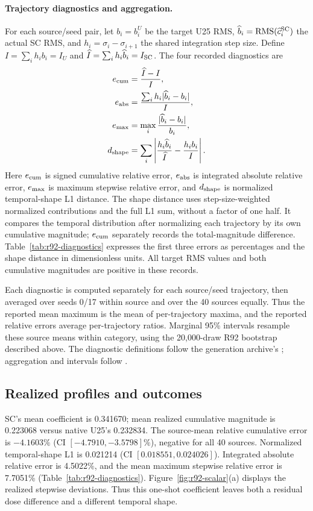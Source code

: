 \documentclass[10pt,doubleanonymous]{ieeeconf}
\newcommand{\RMS}{\operatorname{RMS}}
\begin{document}
\paragraph{Trajectory diagnostics and aggregation.}
For each source/seed pair, let $b_i=b_i^U$ be the target U25 RMS, $\widehat b_i=\RMS(\widehat c_i^{\rm SC})$ the actual SC RMS, and $h_i=\sigma_i-\sigma_{i+1}$ the shared integration step size. Define $I=\sum_i h_i b_i=I_U$ and $\widehat I=\sum_i h_i\widehat b_i=I_{\rm SC}$. The four recorded diagnostics are
\begin{align}
e_{\rm cum}&=\frac{\widehat I-I}{I},\\
e_{\rm abs}&=\frac{\sum_i h_i|\widehat b_i-b_i|}{I},\\
e_{\rm max}&=\max_i\frac{|\widehat b_i-b_i|}{b_i},\\
d_{\rm shape}&=\sum_i\left|\frac{h_i\widehat b_i}{\widehat I}-\frac{h_i b_i}{I}\right|.
\end{align}
Here $e_{\rm cum}$ is signed cumulative relative error, $e_{\rm abs}$ is integrated absolute relative error, $e_{\rm max}$ is maximum stepwise relative error, and $d_{\rm shape}$ is normalized temporal-shape L1 distance. The shape distance uses step-size-weighted normalized contributions and the full L1 sum, without a factor of one half. It compares the temporal distribution after normalizing each trajectory by its own cumulative magnitude; $e_{\rm cum}$ separately records the total-magnitude difference. Table~\ref{tab:r92-diagnostics} expresses the first three errors as percentages and the shape distance in dimensionless units. All target RMS values and both cumulative magnitudes are positive in these records.

Each diagnostic is computed separately for each source/seed trajectory, then averaged over seeds 0/17 within source and over the 40 sources equally. Thus the reported mean maximum is the mean of per-trajectory maxima, and the reported relative errors average per-trajectory ratios. Marginal 95\% intervals resample these source means within category, using the 20,000-draw R92 bootstrap described above. The diagnostic definitions follow the generation archive's ; aggregation and intervals follow .




\subsection{Realized profiles and outcomes}
SC's mean coefficient is 0.341670; mean realized cumulative magnitude is 0.223068 versus native U25's 0.232834. The source-mean relative cumulative error is $-4.1603\%$ (CI $[-4.7910,-3.5798]\%$), negative for all 40 sources. Normalized temporal-shape L1 is 0.021214 (CI $[0.018551,0.024026]$). Integrated absolute relative error is 4.5022\%, and the mean maximum stepwise relative error is 7.7051\% (Table~\ref{tab:r92-diagnostics}). Figure~\ref{fig:r92-scalar}(a) displays the realized stepwise deviations. Thus this one-shot coefficient leaves both a residual dose difference and a different temporal shape.
\end{document}
